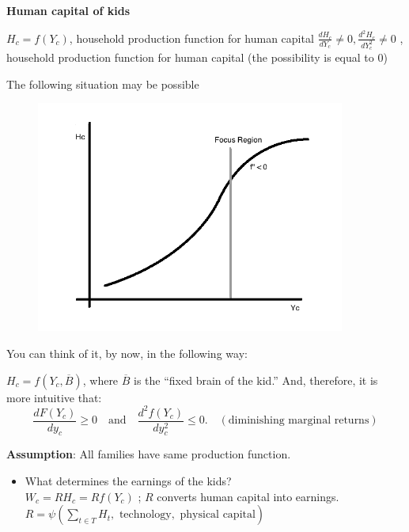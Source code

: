 \documentclass[14pt,notitlepage]{article}
\begin{document}
\vspace{10mm}

\noindent \textbf{Human capital of kids}

\noindent $H_c = f(Y_c)$, household production function for human capital
\noindent $\frac{dH_c}{dY_c} \neq 0, \frac{d^2H_c}{dY^2_c} \neq 0$ , household production function for human capital (the possibility is equal to $0$)

\noindent The following situation may be possible

\begin{center}
\begin{figure}[H] 
\caption{}
\label{figure:youlabel}
\centering
\includegraphics[width=4in, height=3in]{plot1.png}
\end{figure}
\end{center}

You can think of it, by now, in the following way:

\noindent $H_c = f(Y_c, \overline{B})$, where $\overline{B}$ is the ``fixed brain of the kid.'' And, therefore, it is more intuitive that:
\begin{equation*}
\frac{dF (Y_c)}{dy_c} \geq 0 \quad \text{and} \quad \frac{d^2 f(Y_c)}{d y_c^2} \leq 0. \quad (\text{diminishing marginal returns})
\end{equation*}

\vspace{10mm}

\noindent \textbf{Assumption}: All families have same production function.

\begin{itemize}
\item What determines the earnings of the kids?\\
    $W_c = R H_c = R f(Y_c)$ ; $R$ converts human capital into earnings.\\
    $\displaystyle R = \psi (\sum_{t\in T} H_t, \text{ technology}, \text{ physical capital})$
\end{itemize}
\end{document}
